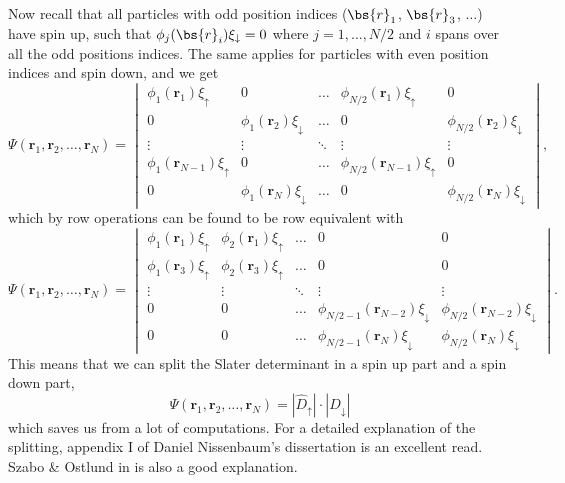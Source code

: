 Now recall that all particles with odd position indices ($\bs{r}_1$, $\bs{r}_3$, $\hdots$) have spin up, such that $\phi_j(\bs{r}_i)\xi_{\downarrow}=0$ where $j=1,\hdots,N/2$ and $i$ spans over all the odd positions indices. The same applies for particles with even position indices and spin down, and we get 
\begin{equation*}
\Psi(\boldsymbol{r}_1,\boldsymbol{r}_2,\hdots,\boldsymbol{r}_N)=
\begin{vmatrix}
\phi_1(\boldsymbol{r}_1)\xi_{\uparrow} & 0 & \hdots & \phi_{N/2}(\boldsymbol{r}_1)\xi_{\uparrow} & 0\\
0 & \phi_1(\boldsymbol{r}_2)\xi_{\downarrow} & \hdots & 0 & \phi_{N/2}(\boldsymbol{r}_2)\xi_{\downarrow}\\
\vdots & \vdots & \ddots & \vdots & \vdots\\
\phi_1(\boldsymbol{r}_{N-1})\xi_{\uparrow} & 0 & \hdots & \phi_{N/2}(\boldsymbol{r}_{N-1})\xi_{\uparrow} & 0\\
0 & \phi_1(\boldsymbol{r}_N)\xi_{\downarrow} & \hdots & 0 & \phi_{N/2}(\boldsymbol{r}_N)\xi_{\downarrow}
\end{vmatrix},
\end{equation*}
which by row operations can be found to be row equivalent with
\begin{equation*}
\Psi(\boldsymbol{r}_1,\boldsymbol{r}_2,\hdots,\boldsymbol{r}_N)=
\begin{vmatrix}
\phi_1(\boldsymbol{r}_1)\xi_{\uparrow} & \phi_2(\boldsymbol{r}_1)\xi_{\uparrow} & \hdots & 0 & 0\\
\phi_1(\boldsymbol{r}_3)\xi_{\uparrow} & \phi_2(\boldsymbol{r}_3)\xi_{\uparrow} & \hdots & 0 & 0\\
\vdots & \vdots & \ddots & \vdots & \vdots\\
0 & 0 & \hdots & \phi_{N/2-1}(\boldsymbol{r}_{N-2})\xi_{\downarrow} & \phi_{N/2}(\boldsymbol{r}_{N-2})\xi_{\downarrow}\\
0 & 0 & \hdots & \phi_{N/2-1}(\boldsymbol{r}_N)\xi_{\downarrow} & \phi_{N/2}(\boldsymbol{r}_N)\xi_{\downarrow}
\end{vmatrix}.
\end{equation*}
This means that we can split the Slater determinant in a spin up part and a spin down part,
\begin{equation}
\Psi(\boldsymbol{r}_1,\boldsymbol{r}_2,\hdots,\boldsymbol{r}_N)=|\hat{D}_{\uparrow}|\cdot |\hat{D}_{\downarrow}|
\end{equation}
which saves us from a lot of computations. For a detailed explanation of the splitting, appendix I of Daniel Nissenbaum's dissertation is an excellent read. \cite{nissenbaum_stochastic_2008} Szabo \& Ostlund in \cite{szabo_modern_1996} is also a good explanation. 

